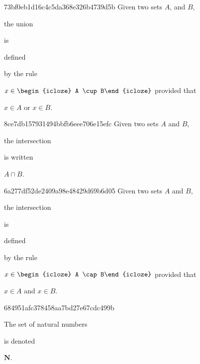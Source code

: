\begin{note}{73bf0eb1d16c4c5da368e326b4739d5b}
    Given two sets \({ A }\), and \({ B }\), \begin{icloze}{2}the union\end{icloze} is \begin{icloze}{3}defined\end{icloze} by the rule
    \begin{center}
        \({ x \in \begin{icloze}{2}A \cup B\end{icloze} }\) provided that \begin{icloze}{1}\({ x \in A }\) or \({ x \in B }\).\end{icloze}
    \end{center}
\end{note}

\begin{note}{8ce7db157931494bbfb6eee706e15efc}
    Given two sets \({ A }\) and \({ B }\), \begin{icloze}{1}the intersection\end{icloze} is written \begin{icloze}{2}\({ A \cap B }\).\end{icloze}
\end{note}

\begin{note}{6a277df52de2409a98e48429d69b6d05}
    Given two sets \({ A }\) and \({ B }\), \begin{icloze}{2}the intersection\end{icloze} is \begin{icloze}{3}defined\end{icloze} by the rule
    \begin{center}
        \({ x \in \begin{icloze}{2}A \cap B\end{icloze} }\) provided that \begin{icloze}{1}\({ x \in A }\) and \({ x \in B }\).\end{icloze}
    \end{center}
\end{note}

\begin{note}{684951afc378458aa7bd27e67cdc499b}
    \begin{icloze}{2}The set of natural numbers\end{icloze} is denoted \begin{icloze}{1}\({ \mathbf{N} }\).\end{icloze}
\end{note}

